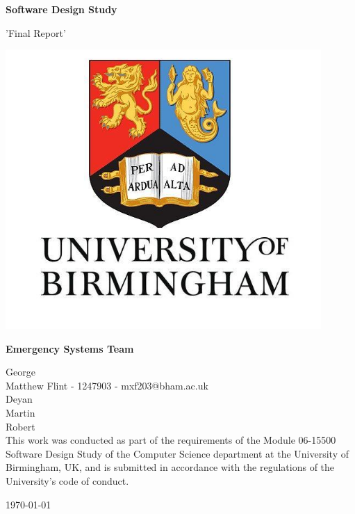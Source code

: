 \documentclass{article}
\begin{document}
    \begin{center}
        \LARGE
        \textbf{Software Design Study}
        
        \vspace{0.2cm}
        \large
        'Final Report'
        
        \vspace{1cm}
        \includegraphics[width=0.9\textwidth]{university}

        \vfill
        
        \large
        \textbf{Emergency Systems Team}
        
        \vspace{0.3cm}
        \normalsize
        George\\
        Matthew Flint - 1247903 - mxf203@bham.ac.uk\\
        Deyan\\
        Martin\\
        Robert\\
        
        \vspace{0.5cm}
		This work was conducted as part of the requirements of the Module 06-15500 Software Design Study of the Computer Science department at the University of Birmingham, UK, and is submitted in accordance with the regulations of the University's code of conduct.
		
		\vspace{0.2cm}
		\today
		
    \end{center}
    \newpage
\end{document}
